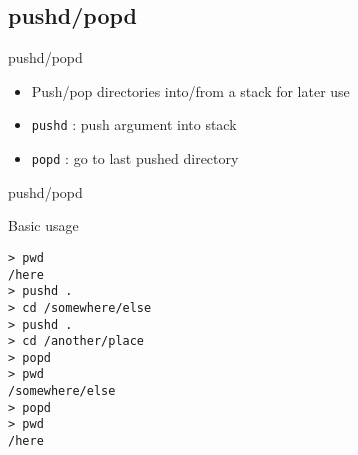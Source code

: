 \subsection{pushd/popd}

\begin{frame}[fragile]{pushd/popd}
  \begin{itemize}
    \pause \item Push/pop directories into/from a stack for later use
    \pause \item \texttt{pushd} : push argument into stack
    \pause \item \texttt{popd} : go to last pushed directory
  \end{itemize}
  \pause
\end{frame}

\begin{frame}[fragile]{pushd/popd}
  \begin{exampleblock}{Basic usage}
    \begin{lstlisting}[showstringspaces=false,basicstyle=\tiny]
> pwd
/here
> pushd .
> cd /somewhere/else
> pushd .
> cd /another/place
> popd
> pwd
/somewhere/else
> popd
> pwd
/here
    \end{lstlisting}
  \end{exampleblock}
\end{frame}


